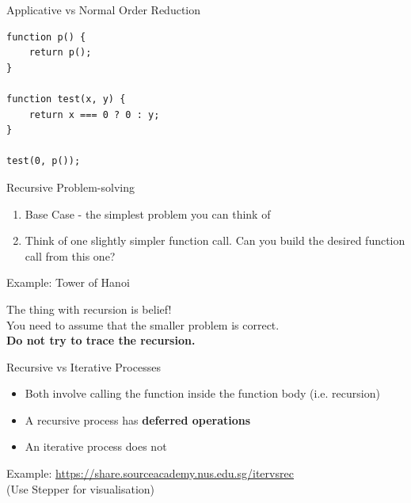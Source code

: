 \documentclass[10pt]{beamer}
\begin{document}
\begin{frame}[fragile]{Applicative vs Normal Order Reduction}
\begin{verbatim}
function p() {
    return p();
}

function test(x, y) {
    return x === 0 ? 0 : y;
}

test(0, p());
\end{verbatim}
\end{frame}

\begin{frame}[fragile]{Recursive Problem-solving}
  \begin{enumerate}
    \item Base Case - the simplest problem you can think of
    \item Think of one slightly simpler function call. Can you build the desired function call from this one?
  \end{enumerate}
  Example: Tower of Hanoi

  The thing with recursion is belief! \\
  You need to assume that the smaller problem is correct. \\
  \textbf{Do not try to trace the recursion.}
\end{frame}

\begin{frame}[fragile]{Recursive vs Iterative Processes}
  \begin{itemize}
    \item Both involve calling the function inside the function body (i.e. recursion)
    \item A recursive process has \textbf{deferred operations}
    \item An iterative process does not
  \end{itemize}  
    Example: \href{https://share.sourceacademy.nus.edu.sg/itervsrec}{\underline{https://share.sourceacademy.nus.edu.sg/itervsrec}} \\
    (Use Stepper for visualisation)
\end{frame}
\end{document}
